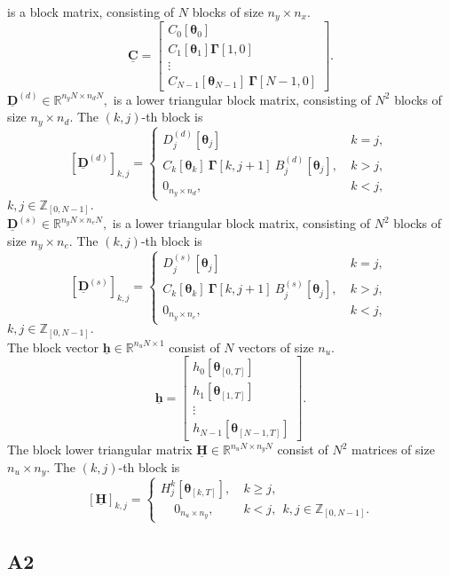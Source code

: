 \documentclass[letterpaper,11pt]{article}
\newcommand{\AR}[2]{\left[\begin{array}{#1}#2\end{array}\right]}
\begin{document}
	is a block matrix, consisting of $N$ blocks of size $ n_y \times n_x$.
	$$
	\underline{\mathbf{C}} = \AR{c} { C_0[\bm{\theta}_0]  \\ C_1[\bm{\theta}_1]  \bm{\Gamma}[1,0]  \\ \vdots \\ C_{N-1}[\bm{\theta}_{N-1}] ~ \bm{\Gamma}[N-1,0] }.
$$
$\underline{\mathbf{D}}^{(d)}  \in \mathbb{R}^{n_y  N \times n_d N},$ 	
is a lower triangular block matrix, consisting of $N^2$ blocks of size $ n_y \times n_d$.
The $(k,j)$-th block is
$$
[\underline{\mathbf{D}}^{(d)}]_{k,j} = 	\begin{cases}
D_j^{(d)}[\bm{\theta}_j]~& k = j, \\
C_k[\bm{\theta}_k] ~  \bm{\Gamma}[k,j+1]~   B_j^{(d)}[\bm{\theta}_j], ~& k > j, \\
0_{n_y \times n_d}, ~& k < j,~ 
\end{cases}
$$	
$k,j \in \mathbb{Z}_{[0,N-1]}.$\\
\noindent 
$\underline{\mathbf{D}}^{(s)}  \in \mathbb{R}^{n_y  N \times n_e N},$ 	
is a lower triangular block matrix, consisting of $N^2$ blocks of size $ n_y \times n_e$.
The $(k,j)$-th block is
$$
[\underline{\mathbf{D}}^{(s)}]_{k,j} = 	\begin{cases}
D_j^{(s)}[\bm{\theta}_j]~& k = j, \\
C_k[\bm{\theta}_k] ~  \bm{\Gamma}[k,j+1]~   B_j^{(s)}[\bm{\theta}_j], ~& k > j, \\
0_{n_y \times n_e}, ~& k < j,~ 
\end{cases}
$$	
$k,j \in \mathbb{Z}_{[0,N-1]}.$\\
\noindent The block vector $ \underline{\mathbf{h}} \in \mathbb{R}^{n_u  N \times 1}$ consist of $N$ vectors of size $ n_u$.
$$
\underline{\mathbf{h}} = \AR{c}{h_0[\bm{\theta}_{[0,T]}] \\  h_1[\bm{\theta}_{[1,T]}] \\ \vdots \\ h_{N-1}[\bm{\theta}_{[N-1,T]}]}.
$$
The  block lower triangular matrix 
$\underline{\mathbf{H}} \in \mathbb{R}^{n_u  N \times n_y  N} $ consist of $N^2$ matrices of size $ n_u \times n_y$.
The $(k,j)$-th block is
$$
[\underline{\mathbf{H}}]_{k,j} = 	\begin{cases}
H_j^k[\bm{\theta}_{[k,T]}], ~& k \geq j, \\
~~~~~0_{n_u \times n_y}, ~& k < j,~~ k,j \in \mathbb{Z}_{[0,N-1]}.
\end{cases}
$$	


\subsection*{A2}
\end{document}
